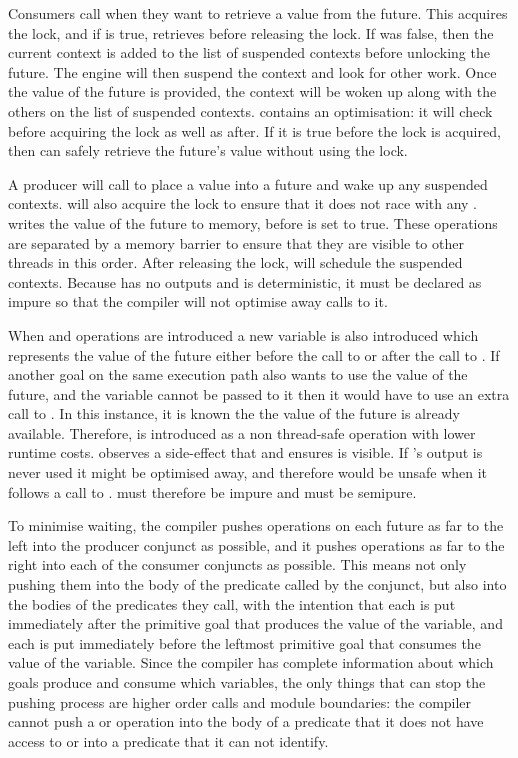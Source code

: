 Consumers call \wait when they want to retrieve a value from the future.
This acquires the lock, and if  is true, retrieves
 before releasing the lock.
If  was false, then the current context is added to
the list of suspended contexts before unlocking the future.
The engine will then suspend the context and look for other work.
Once the value of the future is provided,
the context will be woken up along with the others on the list of suspended contexts.
\wait contains an optimisation:
it will check  before
acquiring the lock as well as after.
If it is true before the lock is acquired,
then \wait can safely retrieve the
future's value without using the lock.

A producer will call \signal to place a value into a future and wake up any
suspended contexts.
\signal will also acquire the lock to ensure that it does not race with any \wait.
\signal writes the value of the future to memory,
before 
 is set to true.
These operations are separated by a memory barrier to ensure that they are
visible to other threads in this order.
After releasing the lock, \signal will schedule the suspended contexts.
Because \signal has no outputs and is deterministic,
it must be declared as impure so that the compiler will not optimise away calls
to it.

When \wait and \signal operations are introduced
a new variable is also introduced
which represents the value of the future
either before the call to \signal or after the call to \wait.
If another goal on the same execution path also wants to use the value of
the future, and the variable cannot be passed to it then it would have to
use an extra call to \wait.
In this instance, it is known the the value of the future is already available.
Therefore,
\get is introduced as a non thread-safe operation with lower runtime costs.
\get observes a side-effect that \wait and \signal ensures is visible.
If \wait's output is never used it might be optimised away,
and therefore \get would be unsafe when it follows a call to \wait.
\wait must therefore be impure and \get must be semipure.

To minimise waiting,
the compiler pushes \signal operations on each future
as far to the left into the producer conjunct as possible,
and it pushes \wait operations
as far to the right into each of the consumer conjuncts as possible.
This means not only pushing them
into the body of the predicate called by the conjunct,
but also into the bodies of the predicates they call,
with the intention that
each \signal is put immediately after
the primitive goal that produces the value of the variable,
and each \wait is put immediately before
the leftmost primitive goal that consumes the value of the variable.
Since the compiler has complete information
about which goals produce and consume which variables,
the only things that can stop the pushing process
are higher order calls and module boundaries:
the compiler cannot push a \wait or \signal operation
into the body of a predicate that it does not have access to
or into a predicate that it can not identify.

